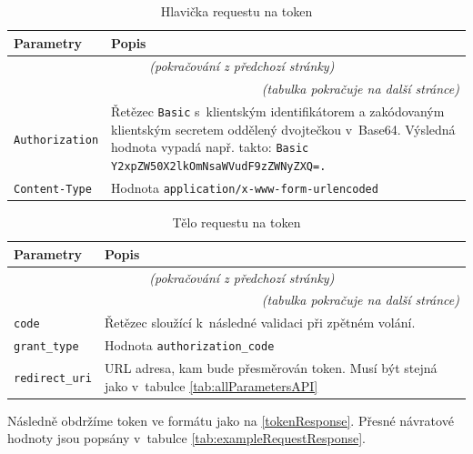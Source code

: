\documentclass[czech, bc, kiv, he, iso690numb, viewonly]{fasthesis} %
\begin{document}
	\begin{longtable}{p{}p{}}
	\caption{Hlavička requestu na token \cite{emplifiDocs}}
	\label{tab:exampleRequestHeader}\\
	\toprule[1.5pt]
	\textbf{Parametry} & \textbf{Popis}\\
	\midrule
	\endfirsthead
	\multicolumn{2}{c}{\tablename{}~\thetable{} \textit{(pokračování z předchozí stránky)}}\\
	\endhead
	\midrule
	\multicolumn{2}{r}{\textit{(tabulka pokračuje na další stránce)}}\\
	\endfoot
	\bottomrule[1.5pt]
	\endlastfoot
	\verb"Authorization" & Řetězec \texttt{Basic} s~klientským identifikátorem a zakódovaným klientským secretem oddělený dvojtečkou v~Base64. Výsledná hodnota vypadá např. takto: \texttt{Basic Y2xpZW50X2lkOmNsaWVudF9zZWNyZXQ=.}\\
	\midrule
	\verb"Content-Type" & Hodnota \texttt{application/x-www-form-urlencoded} \\
	\end{longtable}

	\begin{longtable}{p{}p{}}
	\caption{Tělo requestu na token \cite{emplifiDocs}}
	\label{tab:exampleRequestBody}\\
	\toprule[1.5pt]
	\textbf{Parametry} & \textbf{Popis}\\
	\midrule
	\endfirsthead
	\multicolumn{2}{c}{\tablename{}~\thetable{} \textit{(pokračování z předchozí stránky)}}\\
	\endhead
	\midrule
	\multicolumn{2}{r}{\textit{(tabulka pokračuje na další stránce)}}\\
	\endfoot
	\bottomrule[1.5pt]
	\endlastfoot
	\verb"code" & Řetězec sloužící k~následné validaci při zpětném volání. \\
	\midrule
	\verb"grant_type" & Hodnota \texttt{authorization\_code} \\
	\midrule
	\verb"redirect_uri" & URL adresa, kam bude přesměrován token. Musí být stejná jako v~tabulce \ref{tab:allParametersAPI} \\
	\end{longtable}

Následně obdržíme token ve formátu jako na \ref{tokenResponse}. Přesné návratové hodnoty jsou popsány v~tabulce \ref{tab:exampleRequestResponse}.
\end{document}
